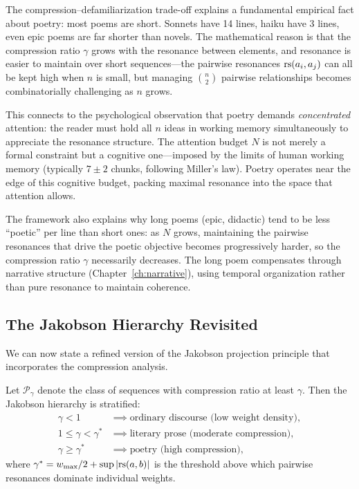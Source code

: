 \begin{interpretation}
\label{interp:compression}
The compression--defamiliarization trade-off explains a fundamental empirical
fact about poetry: most poems are short.  Sonnets have 14 lines, haiku have
3 lines, even epic poems are far shorter than novels.  The mathematical reason
is that the compression ratio $\gamma$ grows with the resonance between
elements, and resonance is easier to maintain over short sequences---the
pairwise resonances $\mathrm{rs}(a_i, a_j)$ can all be kept high when $n$ is small,
but managing $\binom{n}{2}$ pairwise relationships becomes combinatorially
challenging as $n$ grows.

This connects to the psychological observation that poetry demands
\emph{concentrated} attention: the reader must hold all $n$ ideas in working
memory simultaneously to appreciate the resonance structure.  The attention
budget $N$ is not merely a formal constraint but a cognitive one---imposed by
the limits of human working memory (typically $7 \pm 2$ chunks, following
Miller's law).  Poetry operates near the edge of this cognitive budget,
packing maximal resonance into the space that attention allows.

The framework also explains why long poems (epic, didactic) tend to be less
``poetic'' per line than short ones: as $N$ grows, maintaining the pairwise
resonances that drive the poetic objective becomes progressively harder,
so the compression ratio $\gamma$ necessarily decreases.  The long poem
compensates through narrative structure (Chapter~\ref{ch:narrative}), using
temporal organization rather than pure resonance to maintain coherence.
\end{interpretation}

\subsection{The Jakobson Hierarchy Revisited}

We can now state a refined version of the Jakobson projection principle that
incorporates the compression analysis.

\begin{theorem}
\label{thm:jakobson-hierarchy}
Let $\mathcal{P}_\gamma$ denote the class of sequences with compression ratio
at least $\gamma$.  Then the Jakobson hierarchy is stratified:
\begin{align}
  \gamma < 1 &\implies \text{ordinary discourse (low weight density)}, \\
  1 \leq \gamma < \gamma^\ast &\implies \text{literary prose (moderate compression)}, \\
  \gamma \geq \gamma^\ast &\implies \text{poetry (high compression)},
\end{align}
where $\gamma^\ast = w_{\max}/2 + \sup |\mathrm{rs}(a, b)|$ is the threshold above
which pairwise resonances dominate individual weights.
\end{theorem}

